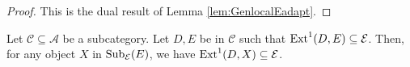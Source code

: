 \begin{proof}
This is the dual result of Lemma \ref{lem:GenlocalEadapt}.

\end{proof}

\begin{lemma}
\label{lemma:subdiagram}
Let $\mathscr{C} \subseteq \mathscr{A}$ be a subcategory. Let $D,E$ be in $\mathscr{C}$ such that $\operatorname{Ext}^1(D,E) \subseteq \mathcal{E}$. Then, for any object $X$ in $\operatorname{Sub}_\mathcal{E}(E)$, we have $\operatorname{Ext}^1(D,X) \subseteq \mathcal{E}$.
\end{lemma}

